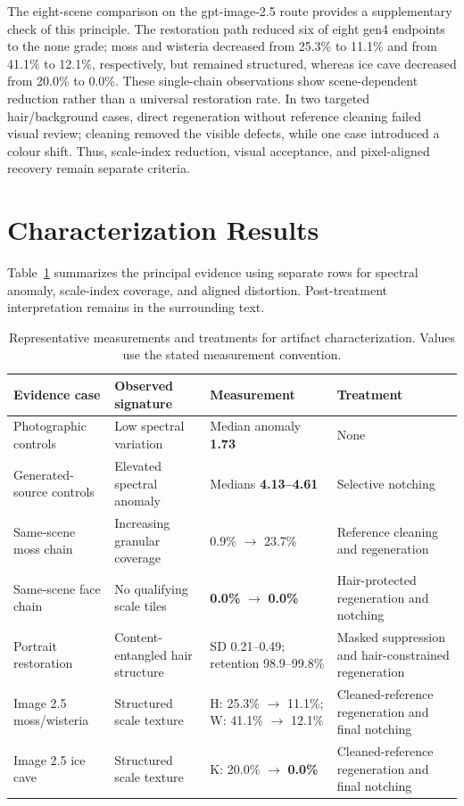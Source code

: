\documentclass[sigplan,10pt,nonacm]{acmart}
\begin{document}
The eight-scene comparison on the gpt-image-2.5 route provides a supplementary check of this principle. The restoration path reduced six of eight gen4 endpoints to the none grade; moss and wisteria decreased from 25.3\% to 11.1\% and from 41.1\% to 12.1\%, respectively, but remained structured, whereas ice cave decreased from 20.0\% to 0.0\%. These single-chain observations show scene-dependent reduction rather than a universal restoration rate. In two targeted hair/background cases, direct regeneration without reference cleaning failed visual review; cleaning removed the visible defects, while one case introduced a colour shift. Thus, scale-index reduction, visual acceptance, and pixel-aligned recovery remain separate criteria.

\section{Characterization Results}
\label{sec:results}
Table~\ref{tab:evidence-matrix} summarizes the principal evidence using separate rows for spectral anomaly, scale-index coverage, and aligned distortion. Post-treatment interpretation remains in the surrounding text.

\begin{table}[t]
\caption{Representative measurements and treatments for artifact characterization. Values use the stated measurement convention.}
\label{tab:evidence-matrix}
\centering\small
\begin{tabular}{p{}p{}p{}p{}}
\toprule
Evidence case & Observed signature & Measurement & Treatment \\
\midrule
Photographic controls & Low spectral variation & Median anomaly \textbf{1.73} & None \\
Generated-source controls & Elevated spectral anomaly & Medians \textbf{4.13--4.61} & Selective notching \\
Same-scene moss chain & Increasing granular coverage & 0.9\% $\rightarrow$ 23.7\% & Reference cleaning and regeneration \\
Same-scene face chain & No qualifying scale tiles & \textbf{0.0\%} $\rightarrow$ \textbf{0.0\%} & Hair-protected regeneration and notching \\
Portrait restoration & Content-entangled hair structure & SD 0.21--0.49; retention 98.9--99.8\% & Masked suppression and hair-constrained regeneration \\
Image 2.5 moss/wisteria & Structured scale texture & H: 25.3\% $\rightarrow$ 11.1\%; W: 41.1\% $\rightarrow$ 12.1\% & Cleaned-reference regeneration and final notching \\
Image 2.5 ice cave & Structured scale texture & K: 20.0\% $\rightarrow$ \textbf{0.0\%} & Cleaned-reference regeneration and final notching \\
\bottomrule
\end{tabular}
\end{table}
\end{document}
